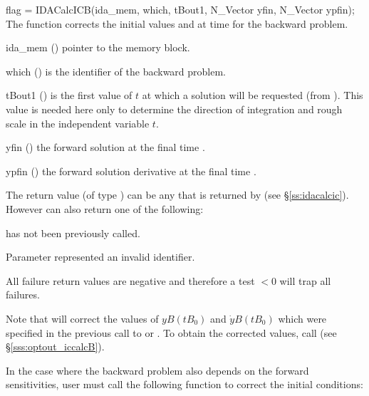 {
  flag = IDACalcICB(ida\_mem, which, tBout1, N\_Vector yfin, N\_Vector ypfin);
}
{
  The function  corrects the initial values  and  at
  time  for the backward problem.
}
{
  \begin{args}
  \item[ida\_mem] ()
    pointer to the {\idas} memory block.
  \item[which] ()
    is the identifier of the backward problem.
  \item[tBout1] ()
    is the first value of $t$ at which a solution will be requested (from
    ). This value is needed here only to determine the direction of
    integration and rough scale in the independent variable $t$.   
  \item[yfin] ()
    the forward solution at the final time .
  \item[ypfin] ()
    the forward solution derivative at the final time .
  \end{args}
}
{
  The return value  (of type ) can be any that is returned by 
   (see \S\ref{ss:idacalcic}). However  can also 
  return one of the following:

  \begin{args}
  \item[\Id{IDA\_NO\_ADJ}]
     has not been previously called.
  \item[\id{IDA\_ILL\_INPUT}]
    Parameter  represented an invalid identifier.
  \end{args}
}
{
  All failure return values are negative and therefore a test  $< 0$
  will trap all  failures.

  Note that  will correct the values of $yB(tB_0)$ and 
  $\dot{y}B(tB_0)$ which were specified in the previous call to  
  or . To obtain the corrected values, call 
   (see \S\ref{sss:optout_iccalcB}).
}

In the case where the backward problem also depends on the forward sensitivities, 
user must call the following function to correct the initial conditions:

